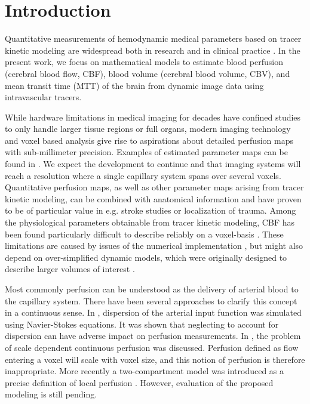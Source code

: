 \documentclass[journal,twocolumn]{IEEEtran}
\begin{document}
	\section{Introduction}

	Quantitative measurements of hemodynamic medical parameters based on tracer kinetic modeling are widespread both in research and in clinical practice \cite{sourbron13,Feng2013,Chen2011}. 
	In the present work, we focus on mathematical models to estimate blood perfusion (cerebral blood flow, CBF), blood volume (cerebral blood volume, CBV), and mean transit time (MTT) of the brain from dynamic image data using intravascular tracers. 

	While hardware limitations in medical imaging for decades have confined studies to only handle larger tissue regions or full organs, modern imaging technology and voxel based analysis give rise to aspirations about detailed perfusion maps with sub-millimeter precision. Examples of estimated parameter maps can be found in \cite{Feng2013,Chen2011}. We expect the development to continue and that imaging systems will reach a resolution where a single capillary system spans over several voxels.
	Quantitative perfusion maps, as well as other parameter maps arising from tracer kinetic modeling, can be combined with anatomical information and have proven to be of particular value in e.g. stroke studies or localization of trauma.
	Among the physiological parameters obtainable from tracer kinetic modeling, CBF has been found particularly difficult to describe reliably on a voxel-basis \cite{kudo10}.
	These limitations are caused by issues of the numerical implementation \cite{kudo10}, but might also depend on over-simplified dynamic models, which were originally designed to describe larger volumes of interest \cite{zierler00}.	

	Most commonly perfusion can be understood as the delivery of arterial blood to the capillary system.
	There have been several approaches to clarify this concept in a continuous sense.
	In \cite{calamante03}, dispersion of the arterial input function was simulated using Navier-Stokes equations.
	It was shown that neglecting to account for dispersion can have adverse impact on perfusion measurements.
	In \cite{Henkelman1990}, the problem of scale dependent continuous perfusion was discussed. Perfusion defined as flow entering a voxel will scale with voxel size, 
	and this notion of perfusion is therefore inappropriate.	
	More recently a two-compartment model was introduced as a precise definition of local perfusion \cite{sourbron14}.	
	However, evaluation of the proposed modeling is still pending.
\end{document}
